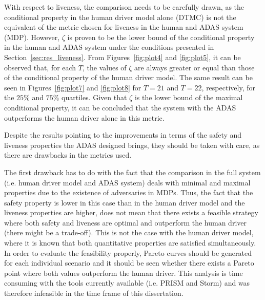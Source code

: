 With respect to liveness, the comparison needs to be carefully drawn, as the conditional property in the human driver model alone (DTMC) is not the equivalent of the metric chosen for liveness in the human and ADAS system (MDP). However, $\zeta$ is proven to be the lower bound of the conditional property in the human and ADAS system under the conditions presented in Section~\ref{sec:res_liveness}. From Figures~\ref{fig:plot4} and \ref{fig:plot5}, it can be observed that, for each $T$, the values of $\zeta$ are always greater or equal than those of the conditional property of the human driver model. The same result can be seen in Figures~\ref{fig:plot7} and \ref{fig:plot8} for $T=21$ and $T=22$, respectively, for the $25\%$ and $75\%$ quartiles. Given that $\zeta$ is the lower bound of the maximal conditional property, it can be concluded that the system with the ADAS outperforms the human driver alone in this metric. 

Despite the results pointing to the improvements in terms of the safety and liveness properties the ADAS designed brings, they should be taken with care, as there are drawbacks in the metrics used. 

The first drawback has to do with the fact that the comparison in the full system (i.e. human driver model and ADAS system) deals with minimal and maximal properties due to the existence of adversaries in MDPs. Thus, the fact that the safety property is lower in this case than in the human driver model and the liveness properties are higher, does not mean that there exists a feasible strategy where both safety and liveness are optimal and outperform the human driver (there might be a trade-off). This is not the case with the human driver model, where it is known that both quantitative properties are satisfied simultaneously. In order to evaluate the feasibility properly, Pareto curves should be generated for each individual scenario and it should be seen whether there exists a Pareto point where both values outperform the human driver. This analysis is time consuming with the tools currently available (i.e. PRISM and Storm) and was therefore infeasible in the time frame of this dissertation. 

